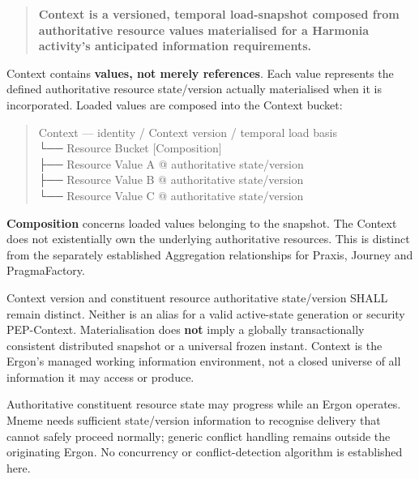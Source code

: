 \begin{quote}


\textbf{Context is a versioned, temporal load-snapshot composed from authoritative
resource values materialised for a Harmonia activity's anticipated information
requirements.}



\end{quote}


Context contains \textbf{values, not merely references}. Each value represents the
defined authoritative resource state/version actually materialised when it is
incorporated. Loaded values are composed into the Context bucket:



\begin{quote}\small\ttfamily
Context — identity / Context version / temporal load basis\\
  └── Resource Bucket                         [Composition]\\
        ├── Resource Value A @ authoritative state/version\\
        ├── Resource Value B @ authoritative state/version\\
        └── Resource Value C @ authoritative state/version\\

\end{quote}


\textbf{Composition} concerns loaded values belonging to the snapshot. The Context
does not existentially own the underlying authoritative resources. This is
distinct from the separately established Aggregation relationships for Praxis,
Journey and PragmaFactory.



Context version and constituent resource authoritative state/version SHALL
remain distinct. Neither is an alias for a valid active-state generation or
security PEP-Context. Materialisation does \textbf{not} imply a globally
transactionally consistent distributed snapshot or a universal frozen instant.
Context is the Ergon's managed working information environment, not a closed
universe of all information it may access or produce.



Authoritative constituent resource state may progress while an Ergon operates.
Mneme needs sufficient state/version information to recognise delivery that cannot
safely proceed normally; generic conflict handling remains outside the originating
Ergon. No concurrency or conflict-detection algorithm is established here.



